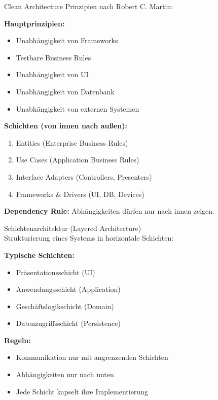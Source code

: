 \begin{KR}{Clean Architecture}
Prinzipien nach Robert C. Martin:

\textbf{Hauptprinzipien:}
\begin{itemize}
    \item Unabhängigkeit von Frameworks
    \item Testbare Business Rules
    \item Unabhängigkeit von UI
    \item Unabhängigkeit von Datenbank
    \item Unabhängigkeit von externen Systemen
\end{itemize}

\textbf{Schichten (von innen nach außen):}
\begin{enumerate}
    \item Entities (Enterprise Business Rules)
    \item Use Cases (Application Business Rules)
    \item Interface Adapters (Controllers, Presenters)
    \item Frameworks \& Drivers (UI, DB, Devices)
\end{enumerate}

\textbf{Dependency Rule:}
Abhängigkeiten dürfen nur nach innen zeigen.
\end{KR}

\begin{concept}{Schichtenarchitektur (Layered Architecture)}\\
Strukturierung eines Systems in horizontale Schichten:

\textbf{Typische Schichten:}
\begin{itemize}
    \item Präsentationsschicht (UI)
    \item Anwendungsschicht (Application)
    \item Geschäftslogikschicht (Domain)
    \item Datenzugriffsschicht (Persistence)
\end{itemize}

\textbf{Regeln:}
\begin{itemize}
    \item Kommunikation nur mit angrenzenden Schichten
    \item Abhängigkeiten nur nach unten
    \item Jede Schicht kapselt ihre Implementierung
\end{itemize}
\end{concept}

